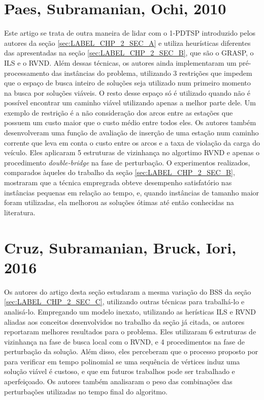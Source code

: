 \section{Paes, Subramanian, Ochi, 2010}\label{sec:LABEL_CHP_2_SEC_D}

Este artigo se trata de outra maneira de lidar com o 1-PDTSP introduzido pelos autores da seção \ref{sec:LABEL_CHP_2_SEC_A} e utiliza heurísticas diferentes das apresentadas na seção \ref{sec:LABEL_CHP_2_SEC_B}, que são o GRASP, o ILS e o RVND. Além dessas técnicas, os autores ainda implementaram um pré-processamento das instâncias do problema, utilizando 3 restrições que impedem que o espaço de busca inteiro de soluções seja utilizado num primeiro momento na busca por soluções viáveis. O resto desse espaço só é utilizado quando não é possível encontrar um caminho viável utilizando apenas a melhor parte dele. Um exemplo de restrição é a não consideração dos arcos entre as estações que possuem um custo maior que o custo médio entre todos eles. Os autores também desenvolveram uma função de avaliação de inserção de uma estação num caminho corrente que leva em conta o custo entre os arcos e a taxa de violação da carga do veículo. Eles aplicaram 5 estruturas de vizinhança no algortimo RVND e apenas o procedimento \textit{double-bridge} na fase de perturbação. O experimentos realizados, comparados àqueles do trabalho da seção \ref{sec:LABEL_CHP_2_SEC_B}, mostraram que a técnica empregrada obteve desempenho satisfatório nas instâncias pequenas em relação ao tempo, e, quando instâncias de tamanho maior foram utilizadas, ela melhorou as soluções ótimas até então conhecidas na literatura. 

\section{Cruz, Subramanian, Bruck, Iori, 2016}\label{sec:LABEL_CHP_2_SEC_E}

Os autores do artigo desta seção estudaram a mesma variação do BSS da seção \ref{sec:LABEL_CHP_2_SEC_C}, utilizando outras técnicas para trabalhá-lo e analisá-lo. Empregando um modelo inexato, utilizando as herísticas ILS e RVND aliadas aos conceitos desenvolvidos no trabalho da seção já citada, os autores reportaram melhores resultados para o problema. Eles utilizaram 6 estruturas de vizinhança na fase de busca local com o RVND, e 4 procedimentos na fase de perturbação da solução. Além disso, eles perceberam que o processo proposto por \citet{art:REF_ART_2} para verificar em tempo polinomial se uma sequência de vértices induz uma solução viável é custoso, e que em futuros trabalhos pode ser trabalhado e aperfeiçoado. Os autores também analisaram o peso das combinações das perturbações utilizadas no tempo final do algoritmo.

